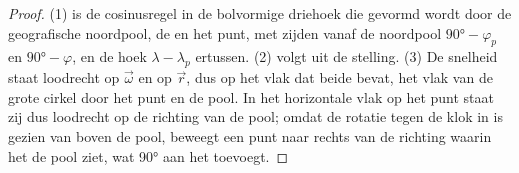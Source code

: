 \begin{proof}
(1) is de cosinusregel in de bolvormige driehoek die gevormd wordt door de geografische noordpool, de  en het punt, met zijden vanaf de noordpool $\ang{90} - \varphi_p$ en $\ang{90} - \varphi$, en de hoek $\lambda - \lambda_p$ ertussen. (2) volgt uit de stelling. (3) De snelheid staat loodrecht op $\vec\omega$ en op $\vec r$, dus op het vlak dat beide bevat, het vlak van de grote cirkel door het punt en de pool. In het horizontale vlak op het punt staat zij dus loodrecht op de richting van de pool; omdat de rotatie tegen de klok in is gezien van boven de pool, beweegt een punt naar rechts van de richting waarin het de pool ziet, wat \ang{90} aan het  toevoegt.
\end{proof}

